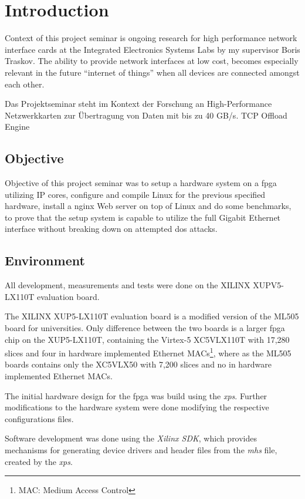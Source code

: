 \chapter{Introduction}

Context of this project seminar is ongoing research for high performance network interface cards at the Integrated Electronics Systems Labs by my supervisor Boris Traskov. 
The ability to provide network interfaces at low cost, becomes especially relevant in the future "`internet of things"' when all devices are connected amongst each other.

Das Projektseminar steht im Kontext der Forschung an High-Performance Netzwerkkarten zur Übertragung von Daten mit bis zu 40 GB/s. TCP Offload Engine

\section{Objective}

Objective of this project seminar was to setup a hardware system on a \gls{fpga} utilizing IP cores, configure and compile Linux for the previous specified hardware, install a nginx Web server on top of Linux and do some benchmarks, to prove that the setup system is capable to utilize the full Gigabit Ethernet interface without breaking down on attempted \gls{dos} attacks.

\section{Environment}

All development, measurements and tests were done on the XILINX XUPV5-LX110T evaluation board.

The XILINX XUP5-LX110T evaluation board is a modified version of the ML505 board for universities. Only difference between the two boards is a larger \gls{fpga} chip on the XUP5-LX110T, containing the Virtex-5 XC5VLX110T with 17,280 slices and four in hardware implemented Ethernet MACs\footnote{MAC: Medium Access Control}, where as the ML505 boards contains only the XC5VLX50 with 7,200 slices and no in hardware implemented Ethernet MACs.

The initial hardware design for the \gls{fpga} was build using the \textit{\gls{xps}}. Further modifications to the hardware system were done modifying the respective configurations files.

Software development was done using the \textit{Xilinx SDK}, which provides mechanisms for generating device drivers and header files from the \textit{\gls{mhs}} file, created by the \textit{\gls{xps}}.

